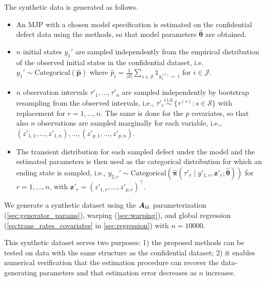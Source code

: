 \documentclass{article}
\newcommand{\RN}[1]{\textup{\uppercase\expandafter{\romannumeral#1}}}
\providecommand{\DIFadd}[1]{{\protect\color{blue} \sf #1}} %
\begin{document}
\DIFadd{The synthetic data is generated as follows.
}\begin{itemize}
\item \DIFadd{An MJP with a chosen model specification is estimated on the confidential defect data using the methods, so that model parameters $\widehat{\bm \theta}$ are obtained.
}\item \DIFadd{$n$ initial states $y_1'$ are sampled independently from the empirical distribution of the observed initial states in the confidential dataset, i.e.
$
y_1' \sim \text{Categorical}(\widehat{\bm p})$ where $\widehat p_i = \frac{1}{| \mathcal S|} \sum_{s\in\mathcal S} \mathds{1}_{y_1^{(s)}=\;i}
$ for $i \in \mathcal J$. 
}\item \DIFadd{$n$ observation intervals $\tau'_1,\dots,\tau'_n$ are sampled independently by bootstrap resampling from the observed intervals, i.e.,
$
\tau'_r \overset{\text{i.i.d.}}{\sim} \{\tau^{(s)}: s\in\mathcal S\} $ with replacement for $ r=1,\dots,n$. The same is done for the $p$ covariates, so that also $n$ observations are sampled marginally for each variable, i.e., $(z'_{1,1},\dots,z'_{1,n} ), \dots, (z'_{p,1},\dots,z'_{p,n})$. 
}\item \DIFadd{The transient distribution for each sampled defect under the model and the estimated parameters is then used as the categorical distribution for which an ending state is sampled, i.e., 
$
y_{2,r}' \sim \text{Categorical}(\widehat{\bm\pi}( \tau'_r \mid y'_{1,r}, \bm z'_r; \widehat{\bm\theta}) )
$ for $r = 1, \dots, n$, with $\bm z'_r = (z'_{1,r},\dots,z'_{p,r})^\top$.
}\end{itemize}
\DIFadd{We generate a synthetic dataset using the $\bm{A}_{\RN{3}}$ parameterization (\cref{sec:generator_params}), warping (\cref{sec:warping}), and global regression (\cref{eq:trans_rates_covariates} in \cref{sec:regression}) with $n = 10000$.
}

\DIFadd{This synthetic dataset serves two purposes: 1) the proposed methods can be tested on data with the same structure as the confidential dataset; 2) it enables numerical verification that the estimation procedure can recover the data-generating parameters and that estimation error decreases as $n$ increases.
}




\newpage
\end{document}
